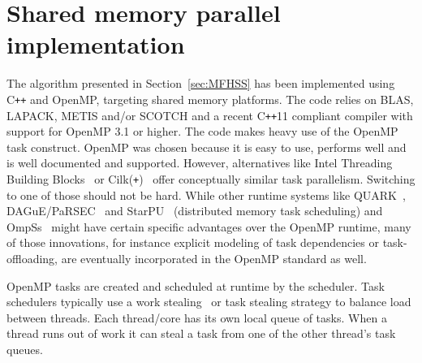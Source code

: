 \documentclass{article}
\newcommand{\tm}{\textsuperscript{\textregistered}}
\begin{document}
\section{Shared memory parallel implementation}\label{sec:implementation}
The algorithm presented in Section~\ref{sec:MFHSS} has been
implemented using C\texttt{++} and OpenMP, targeting shared memory
platforms. The code relies on BLAS, LAPACK, METIS and/or SCOTCH and a
recent C\texttt{++}11 compliant compiler with support for OpenMP 3.1
or higher. The code makes heavy use of the OpenMP task
construct. OpenMP was chosen because it is easy to use, performs well
and is well documented and supported. However, alternatives like
Intel\tm{} Threading Building Blocks~\cite{reinders2007intel} or
Cilk(\texttt{+})~\cite{blumofe1996cilk} offer conceptually similar
task parallelism. Switching to one of those should not be hard. While
other runtime systems like QUARK~\cite{yarkhan2011quark},
DAGuE/PaRSEC~\cite{bosilca2012dague} and
StarPU~\cite{augonnet2011starpu} (distributed memory task scheduling)
and OmpSs~\cite{duran2011ompss} might have certain specific advantages
over the OpenMP runtime, many of those innovations, for instance
explicit modeling of task dependencies or task-offloading, are
eventually incorporated in the OpenMP standard as well.


OpenMP tasks are created and scheduled at runtime by the
scheduler. Task schedulers typically use a work
stealing~\cite{blumofe1999scheduling} or task stealing strategy to
balance load between threads. Each thread/core has its own local queue
of tasks. When a thread runs out of work it can steal a task from one
of the other thread's task queues.
\end{document}
